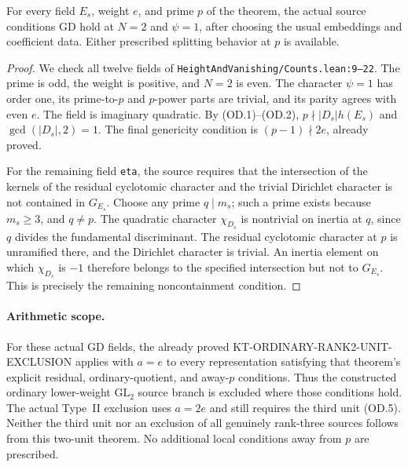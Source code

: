 \begin{corollary}
For every field $E_s$, weight $e$, and prime $p$ of the theorem,
the actual source conditions $\mathrm{GD}$ hold at $N=2$ and
$\psi=1$, after choosing the usual embeddings and coefficient
data.  Either prescribed splitting behavior at $p$ is available.
\end{corollary}
\begin{proof}
We check all twelve fields of
\texttt{HeightAndVanishing/Counts.lean:9--22}.
The prime is odd, the weight is positive, and $N=2$ is even.
The character $\psi=1$ has order one, its prime-to-$p$ and
$p$-power parts are trivial, and its parity agrees with even $e$.
The field is imaginary quadratic.  By (OD.1)--(OD.2),
$p\nmid |D_s|h(E_s)$ and $\gcd(|D_s|,2)=1$.
The final genericity condition is $(p-1)\nmid2e$, already proved.

For the remaining field \texttt{eta}, the source requires that
the intersection of the kernels of the residual cyclotomic
character and the trivial Dirichlet character is not contained
in $G_{E_s}$.  Choose any prime $q\mid m_s$; such a prime exists
because $m_s\geq3$, and $q\ne p$.  The quadratic character
$\chi_{D_s}$ is nontrivial on inertia at $q$, since $q$ divides
the fundamental discriminant.  The residual cyclotomic character
at $p$ is unramified there, and the Dirichlet character is trivial.
An inertia element on which $\chi_{D_s}$ is $-1$ therefore
belongs to the specified intersection but not to $G_{E_s}$.
This is precisely the remaining noncontainment condition.
\end{proof}

\paragraph{Arithmetic scope.}
For these actual GD fields, the already proved
KT-ORDINARY-RANK2-UNIT-EXCLUSION applies with $a=e$ to every
representation satisfying that theorem's explicit residual,
ordinary-quotient, and away-$p$ conditions.  Thus the constructed
ordinary lower-weight $\mathrm{GL}_2$ source branch is excluded
where those conditions hold.  The actual Type~II exclusion uses
$a=2e$ and still requires the third unit (OD.5).
Neither the third unit nor an exclusion of all genuinely rank-three
sources follows from this two-unit theorem.  No additional local
conditions away from $p$ are prescribed.

